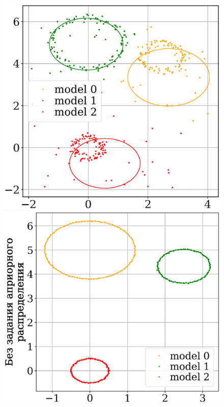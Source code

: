 \documentclass[12pt,twoside]{article}
\begin{document}
\begin{figure}[h!]
\begin{minipage}{.32\textwidth}
\vspace{-3mm}
\hspace{-8.5mm}
      \includegraphics[width =  1.07\textwidth]{902.eps}
\end{minipage}
\begin{minipage}{.32\textwidth}
      \includegraphics[width =  \textwidth]{900.eps}

\end{minipage}
\end{figure}
\end{document}

